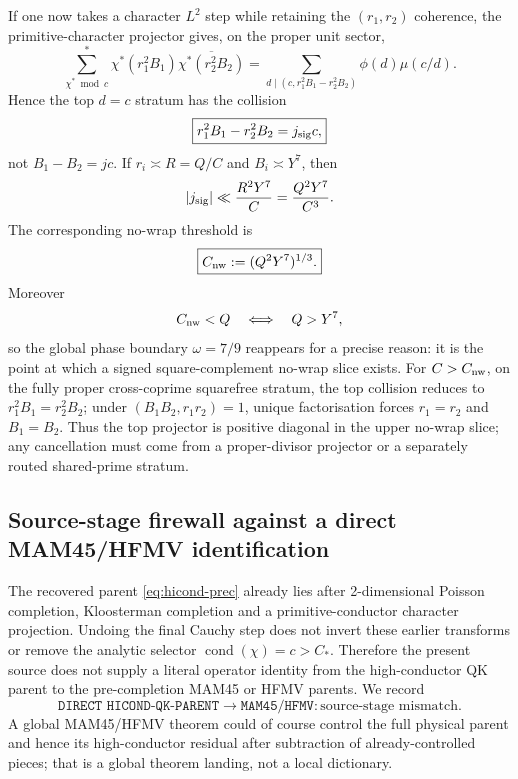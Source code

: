 \documentclass[11pt]{article}
\theoremstyle{definition}
\newcommand{\1}{\mathbf 1}
\begin{document}
If one now takes a character $L^2$ step while retaining the
$(r_1,r_2)$ coherence, the primitive-character projector gives, on the proper
unit sector,
\begin{equation}
\boxed{
 \sum_{\chi^*\bmod c}^{*}
 \chi^*(r_1^2B_1)\overline{\chi^*(r_2^2B_2)}
 =
 \sum_{d\mid(c,r_1^2B_1-r_2^2B_2)}
 \phi(d)\mu(c/d).
}
\label{eq:primitive-projector-square}
\end{equation}
Hence the top $d=c$ stratum has the collision
\begin{equation}
   \boxed{r_1^2B_1-r_2^2B_2=j_{\rm sig}c,}
   \label{eq:signed-square-collision}
\end{equation}
not $B_1-B_2=jc$.  If $r_i\asymp R=Q/C$ and $B_i\asymp Y^7$, then
\[
  |j_{\rm sig}|
  \ll \frac{R^2Y^7}{C}
  =\frac{Q^2Y^7}{C^3}.
\]
The corresponding no-wrap threshold is
\begin{equation}
   \boxed{C_{\rm nw}:=(Q^2Y^7)^{1/3}.}
   \label{eq:cnw}
\end{equation}
Moreover
\[
   C_{\rm nw}<Q\quad\Longleftrightarrow\quad Q>Y^7,
\]
so the global phase boundary $\omega=7/9$ reappears for a precise reason:
it is the point at which a signed square-complement no-wrap slice exists.
For $C>C_{\rm nw}$, on the fully proper cross-coprime squarefree stratum,
the top collision reduces to $r_1^2B_1=r_2^2B_2$; under
$(B_1B_2,r_1r_2)=1$, unique factorisation forces $r_1=r_2$ and $B_1=B_2$.
Thus the top projector is positive diagonal in the upper no-wrap slice; any
cancellation must come from a proper-divisor projector or a separately routed
shared-prime stratum.

\subsection{Source-stage firewall against a direct MAM45/HFMV identification}

The recovered parent \eqref{eq:hicond-prec} already lies after
2-dimensional Poisson completion, Kloosterman completion and a
primitive-conductor character projection.  Undoing the final Cauchy step does
not invert these earlier transforms or remove the analytic selector
$\operatorname{cond}(\chi)=c>C_*$.  Therefore the present source does not
supply a literal operator identity from the high-conductor QK parent to the
pre-completion MAM45 or HFMV parents.  We record
\[
 \boxed{\texttt{DIRECT HICOND-QK-PARENT} \to
        \texttt{MAM45/HFMV}: \text{source-stage mismatch}.}
\]
A global MAM45/HFMV theorem could of course control the full physical parent
and hence its high-conductor residual after subtraction of already-controlled
pieces; that is a global theorem landing, not a local dictionary.
\end{document}
